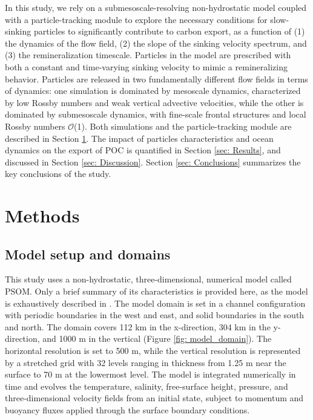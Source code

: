 \documentclass[draft,linenumbers]{agujournal2018}
\begin{document}
In this study, we rely on a submesoscale-resolving non-hydrostatic model coupled with a particle-tracking module to explore the necessary conditions for slow-sinking particles to significantly contribute to carbon export, as a function of (1) the dynamics of the flow field, (2) the slope of the sinking velocity spectrum, and (3) the remineralization timescale. Particles in the model are prescribed with both a constant and time-varying sinking velocity to mimic a remineralizing behavior. Particles are released in two fundamentally different flow fields in terms of dynamics: one simulation is dominated by mesoscale dynamics, characterized by low Rossby numbers and weak vertical advective velocities, while the other is dominated by submesoscale dynamics, with fine-scale frontal structures and local Rossby numbers $\mathcal{O}$(1). Both simulations and the particle-tracking module are described in Section \ref{sec: Methods}. The impact of particles characteristics and ocean dynamics on the export of POC is quantified  in Section \ref{sec: Results}, and discussed in Section \ref{sec: Discussion}. Section \ref{sec: Conclusions} summarizes the key conclusions of the study.

\section{Methods}
\label{sec: Methods}
\subsection{Model setup and domains}

This study uses a non-hydrostatic, three-dimensional, numerical model called PSOM. Only a brief summary of its characteristics is provided here, as the model is exhaustively described in \cite{Mahadevan_1996a,Mahadevan_1996b}. The model domain is set in a channel configuration with periodic boundaries in the west and east, and solid boundaries in the south and north. The domain covers 112 km in the x-direction, 304 km in the y-direction, and 1000 m in the vertical (Figure \ref{fig: model_domain}). The horizontal resolution is set to 500 m, while the vertical resolution is represented by a stretched grid with 32 levels ranging in thickness from 1.25 m near the surface to 70 m at the lowermost level. The model is integrated numerically in time and evolves the temperature, salinity, free-surface height, pressure, and three-dimensional velocity fields from an initial state, subject to momentum and buoyancy fluxes applied through the surface boundary conditions.
\end{document}
